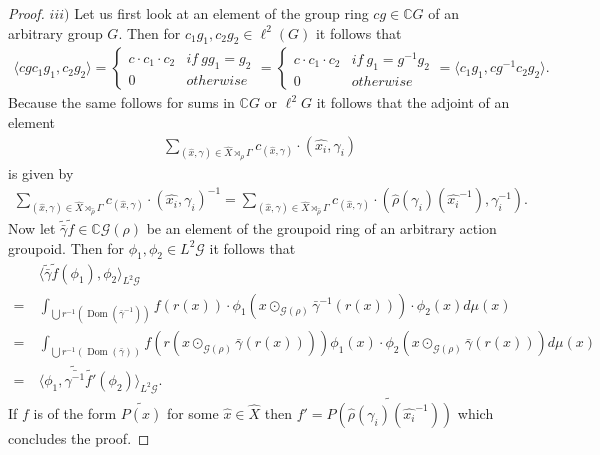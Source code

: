 \documentclass[12pt,a4paper]{scrartcl}
\theoremstyle{plain}
\theoremstyle{definition}
\numberwithin{equation}{section}
\newcommand{\C}{\mathbb{C}} %
\newcommand{\2}{\mathbb{Z} / 2 \mathbb{Z}}
\newcommand{\G}{\mathcal{G}}
\newcommand{\1}{\bar{1}}
\newcommand{\0}{\bar{0}}
\newcommand{\Dom}{\operatorname{Dom}}
\begin{document}
\begin{proof}
	$iii)$ Let us first look at an element of the group ring $c g \in \C G$ of an arbitrary group $G$. Then for $c_1 g_1, c_2 g_2 \in \ell^2(G)$ it follows that 
	\begin{align*}
		\langle c g c_1 g_1, c_2 g_2 \rangle = \begin{cases}
		 	c \cdot c_1 \cdot c_2 & if \ g g_1 = g_2 \\
		 	0 & otherwise
		\end{cases}  = \begin{cases}
		c \cdot c_1 \cdot c_2 & if \ g_1 = g^{-1} g_2 \\
		0 & otherwise
		\end{cases}
		= \langle  c_1 g_1, c g^{-1} c_2 g_2 \rangle.
	\end{align*}
	Because the same follows for sums in $\C G$ or $\ell^2 G$ it follows that the adjoint of an element 
	\begin{align*}
		\sum_{(\hat{x}, \gamma) \in \hat{X} \rtimes_{\hat{\rho}} \Gamma} c_{(\hat{x}, \gamma)} \cdot (\hat{x_i}, \gamma_i)
	\end{align*}
	is given by 
	\begin{align*}
		\sum_{(\hat{x}, \gamma) \in \hat{X} \rtimes_{\hat{\rho}} \Gamma} c_{(\hat{x}, \gamma)} \cdot (\hat{x_i}, \gamma_i)^{-1} = \sum_{(\hat{x}, \gamma) \in \hat{X} \rtimes_{\hat{\rho}} \Gamma} c_{(\hat{x}, \gamma)} \cdot (\hat{\rho}(\gamma_i)(\hat{x_i}^{-1}), \gamma_i^{-1}).
	\end{align*}
	Now let $\tilde{\bar{\gamma}} \tilde{f} \in \C \G(\rho)$ be an element of the groupoid ring of an arbitrary action groupoid. Then for $\phi_1, \phi_2 \in L^2 \G$ it follows that
	\begin{align*}
		 &~ \langle \tilde{\bar{\gamma}} \tilde{f} (\phi_1), \phi_2 \rangle_{L^2 \G} \\
		=&~ \int_{\bigcup r^{-1}(\Dom(\bar{\gamma}^{-1}))} f(r(x)) \cdot \phi_1(x \odot_{\G (\rho)} \bar{\gamma}^{-1}(r(x))) \cdot \phi_2 (x) d \mu (x) \\
		=&~ \int_{\bigcup r^{-1}(\Dom(\bar{\gamma}))} f(r(x \odot_{\G (\rho)} \bar{\gamma}(r(x)))) \phi_1(x ) \cdot \phi_2 (x \odot_{\G (\rho)} \bar{\gamma}(r(x))) d \mu (x) \\
		=&~ \langle \phi_1 ,\tilde{\bar{\gamma^{-1}}} \tilde{f'} (\phi_2) \rangle_{L^2 \G}.
	\end{align*} 
	If $f$ is of the form $\widetilde{P(\hat{x})}$ for some $\hat{x} \in \hat{X}$ then $f' = \widetilde{P(\hat{\rho}(\gamma_i)(\hat{x_i}^{-1}))}$  which concludes the proof.
\end{proof}
\end{document}
